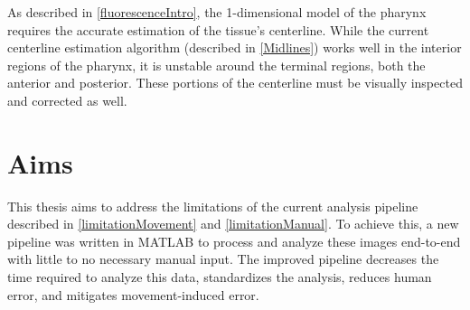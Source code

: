 As described in \ref{fluorescenceIntro}, the 1-dimensional model of the pharynx requires the accurate estimation of the tissue's centerline. While the current centerline estimation algorithm (described in \ref{Midlines}) works well in the interior regions of the pharynx, it is unstable around the terminal regions, both the anterior and posterior. These portions of the centerline must be visually inspected and corrected as well.


\section{Aims}
This thesis aims to address the limitations of the current analysis pipeline described in \ref{limitationMovement} and \ref{limitationManual}. To achieve this, a new pipeline was written in MATLAB to process and analyze these images end-to-end with little to no necessary manual input. The improved pipeline decreases the time required to analyze this data, standardizes the analysis, reduces human error, and mitigates movement-induced error.